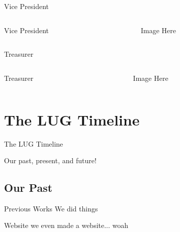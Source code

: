 \documentclass{beamer}
\begin{document}
  
  \begin{frame}{Vice President}
    \begin{columns}
      \begin{column}{0.6\textwidth}

        {\LARGE Vice President}\par
        
      \end{column}
      \begin{column}{0.4\textwidth}
        Image Here
      \end{column}
    \end{columns}
  \end{frame}

  \begin{frame}{Treasurer}
    \begin{columns}
      \begin{column}{0.6\textwidth}

        {\LARGE Treasurer}\par
        
      \end{column}
      \begin{column}{0.4\textwidth}
        Image Here
      \end{column}
    \end{columns}
  \end{frame}


  \section{The LUG Timeline}
  \begin{frame}

   {\Huge The LUG Timeline}
    
    Our past, present, and future!
  \end{frame}

  \subsection{Our Past}
  \begin{frame}{Previous Works}
    We did things
  \end{frame}

  \begin{frame}{Website}
    we even made a website... woah
  \end{frame}
\end{document}
